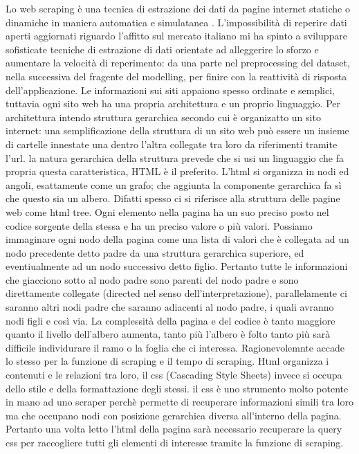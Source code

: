 \documentclass[
  12pt,
  a4paper,
  oneside]{book}
\begin{document}
Lo web scraping è una tecnica di estrazione dei dati da pagine internet statiche o dinamiche in maniera automatica e simulatanea \citep{wiki:xxx}. L'impossibilità di reperire dati aperti aggiornati riguardo l'affitto sul mercato italiano mi ha spinto a sviluppare sofisticate tecniche di estrazione di dati orientate ad alleggerire lo sforzo e aumentare la velocità di reperimento: da una parte nel preprocessing del dataset, nella successiva del fragente del modelling, per finire con la reattività di risposta dell'applicazione.
Le informazioni sui siti appaiono spesso ordinate e semplici, tuttavia ogni sito web ha una propria architettura e un proprio linguaggio. Per architettura intendo struttura gerarchica secondo cui è organizatto un sito internet: una semplificazione della struttura di un sito web può essere un insieme di cartelle innestate una dentro l'altra collegate tra loro da riferimenti tramite l'url. la natura gerarchica della struttura prevede che si usi un linguaggio che fa propria questa caratteristica, HTML è il preferito. L'html si organizza in nodi ed angoli, esattamente come un grafo; che aggiunta la componente gerarchica fa sì che questo sia un albero. Difatti spesso ci si riferisce alla struttura delle pagine web come html tree. Ogni elemento nella pagina ha un suo preciso posto nel codice sorgente della stessa e ha un preciso valore o più valori. Possiamo immaginare ogni nodo della pagina come una lista di valori che è collegata ad un nodo precedente detto padre da una struttura gerarchica superiore, ed eventiualmente ad un nodo successivo detto figlio. Pertanto tutte le informazioni che giacciono sotto al nodo padre sono parenti del nodo padre e sono direttamente collegate (directed nel senso dell'interpretazione), parallelamente ci saranno altri nodi padre che saranno adiacenti al nodo padre, i quali avranno nodi figli e così via.
La complessità della pagina e del codice è tanto maggiore quanto il livello dell'albero aumenta, tanto più l'albero è folto tanto più sarà difficile individurare il ramo o la foglia che ci interessa. Ragionevolemnte accade lo stesso per la funzione di scraping e il tempo di scraping.
Html organizza i contenuti e le relazioni tra loro, il css (Cascading Style Sheets) invece si occupa dello stile e della formattazione degli stessi. il css è uno strumento molto potente in mano ad uno scraper perchè permette di recuperare informazioni simili tra loro ma che occupano nodi con posizione gerarchica diversa all'interno della pagina. Pertanto una volta letto l'html della pagina sarà necessario recuperare la query css per raccogliere tutti gli elementi di interesse tramite la funzione di scraping.
\end{document}
